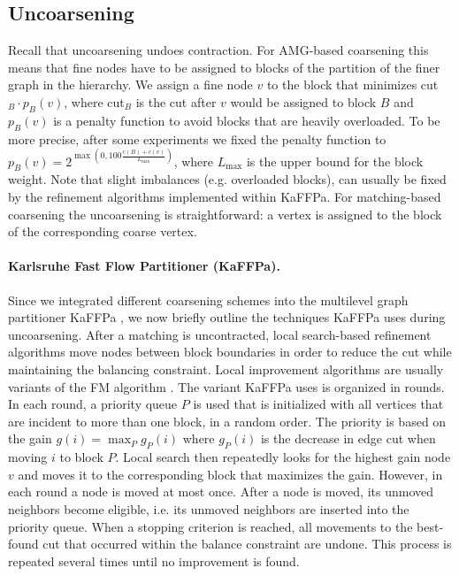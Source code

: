 \documentclass{llncs}
\begin{document}
\subsection{Uncoarsening}\label{sec:uncoarsening}
Recall that uncoarsening undoes contraction. For AMG-based coarsening this means that fine nodes have to be assigned to blocks of the partition of the finer graph in the hierarchy. We assign a fine node $v$ to the block that minimizes cut$_B\cdot p_B(v)$, where cut$_B$ is the cut after $v$ would be assigned to block $B$ and $p_B(v)$ is a penalty function to avoid blocks that are heavily overloaded. To be more precise, after some experiments we fixed the penalty function to $p_B(v) = 2^{\max(0,100 \frac{c(B)+c(v)}{L_\text{max}})}$, where $L_\text{max}$ is the upper bound for the block weight.
Note that slight imbalances (e.g. overloaded blocks), can usually be fixed by the refinement algorithms implemented within KaFFPa.
For matching-based coarsening the uncoarsening is straightforward: 
a vertex is assigned to the block of the corresponding coarse vertex.

\paragraph*{Karlsruhe Fast Flow Partitioner (KaFFPa).}
Since we integrated different coarsening schemes into the multilevel graph partitioner KaFFPa \cite{kaffpa}, we now briefly outline the techniques KaFFPa uses during uncoarsening. 
After a matching is uncontracted, local search-based refinement algorithms move nodes between block boundaries in order to reduce the cut while maintaining the balancing constraint. 
Local improvement algorithms are usually variants of the FM algorithm \cite{fiduccia1982lth}. 
The variant KaFFPa uses is organized in rounds. In each round, a priority queue $P$ is used that is initialized with all vertices that are incident to more than one block, in a random order. 
The priority is based on the gain $g(i) = \max_P g_P(i)$ where $g_P(i)$ is the decrease in edge cut when moving $i$ to block $P$.  
Local search then repeatedly looks for the highest gain node $v$ and moves it to the corresponding block that maximizes the gain.
However, in each round a node is moved at most once. 
After a node is moved, its unmoved neighbors become eligible, i.e. its unmoved neighbors are inserted into the priority queue. 
When a stopping criterion is reached, all movements to the best-found cut that occurred within the balance constraint are undone.
This process is repeated several times until no improvement is found.
\end{document}
